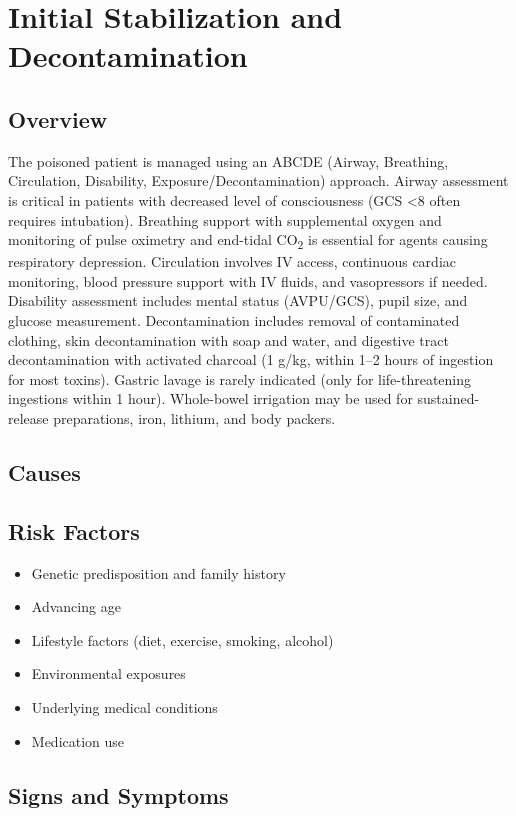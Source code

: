 \chapter{Initial Stabilization and Decontamination}
\label{sec:Initial Stabilization}

\section{Overview}
The poisoned patient is managed using an ABCDE (Airway, Breathing, Circulation, Disability, Exposure/Decontamination) approach. Airway assessment is critical in patients with decreased level of consciousness (GCS <8 often requires intubation). Breathing support with supplemental oxygen and monitoring of pulse oximetry and end-tidal CO\textsubscript{2} is essential for agents causing respiratory depression. Circulation involves IV access, continuous cardiac monitoring, blood pressure support with IV fluids, and vasopressors if needed. Disability assessment includes mental status (AVPU/GCS), pupil size, and glucose measurement. Decontamination includes removal of contaminated clothing, skin decontamination with soap and water, and digestive tract decontamination with activated charcoal (1 g/kg, within 1--2 hours of ingestion for most toxins). Gastric lavage is rarely indicated (only for life-threatening ingestions within 1 hour). Whole-bowel irrigation may be used for sustained-release preparations, iron, lithium, and body packers.
\section{Causes}
\section{Risk Factors}

\begin{itemize}[noitemsep]
  \item Genetic predisposition and family history
  \item Advancing age
  \item Lifestyle factors (diet, exercise, smoking, alcohol)
  \item Environmental exposures
  \item Underlying medical conditions
  \item Medication use
\end{itemize}
\section{Signs and Symptoms}

